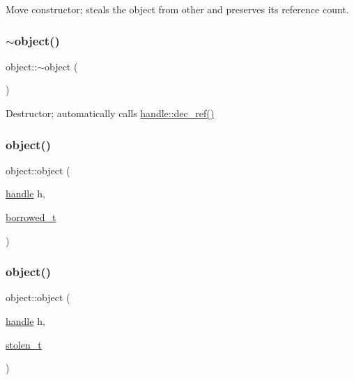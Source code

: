 Move constructor; steals the object from {\ttfamily other} and preserves its reference count. 

\mbox{\label{classobject_aecd824abdc96ff340acf4ea25a34d76d}} 
\subsubsection{\texorpdfstring{$\sim$object()}{~object()}}
{\footnotesize\ttfamily object\+::$\sim$object (\begin{DoxyParamCaption}{ }\end{DoxyParamCaption})\hspace{0.3cm}{\ttfamily [inline]}}



Destructor; automatically calls {\ttfamily \mbox{\hyperlink{classhandle_a03747f7b62a7b61eb7d9d1df25bfa7c4}{handle\+::dec\+\_\+ref()}}} 

\mbox{\label{classobject_ad2db8259e6e585a4b61b9a9a9627b7f0}} 
\subsubsection{\texorpdfstring{object()}{object()}\hspace{0.1cm}{\footnotesize\ttfamily [4/5]}}
{\footnotesize\ttfamily object\+::object (\begin{DoxyParamCaption}\item[{\mbox{\hyperlink{classhandle}{handle}}}]{h,  }\item[{\mbox{\hyperlink{structobject_1_1borrowed__t}{borrowed\+\_\+t}}}]{ }\end{DoxyParamCaption})\hspace{0.3cm}{\ttfamily [inline]}}

\mbox{\label{classobject_a8202a0f0f7fe12a68d8d5fb18e766b07}} 
\subsubsection{\texorpdfstring{object()}{object()}\hspace{0.1cm}{\footnotesize\ttfamily [5/5]}}
{\footnotesize\ttfamily object\+::object (\begin{DoxyParamCaption}\item[{\mbox{\hyperlink{classhandle}{handle}}}]{h,  }\item[{\mbox{\hyperlink{structobject_1_1stolen__t}{stolen\+\_\+t}}}]{ }\end{DoxyParamCaption})\hspace{0.3cm}{\ttfamily [inline]}}



